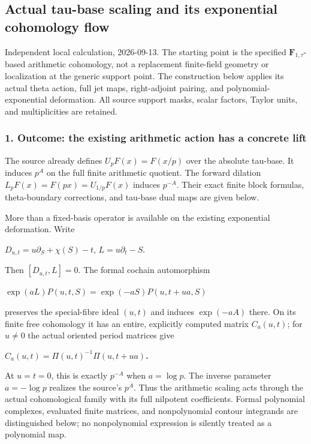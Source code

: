 \subsection{Actual tau-base scaling and its exponential cohomology flow}\label{endpoint-f1_scaling--actual-tau-base-scaling-and-its-exponential-cohomology-flow}

Independent local calculation, 2026-09-13. The starting point is the specified \(\mathbf F_{1,\tau}\)-based arithmetic cohomology, not a replacement finite-field geometry or localization at the generic support point. The construction below applies its actual theta action, full jet maps, right-adjoint pairing, and polynomial-exponential deformation. All source support masks, scalar factors, Taylor units, and multiplicities are retained.

\subsubsection{1. Outcome: the existing arithmetic action has a concrete lift}\label{endpoint-f1_scaling--outcome-the-existing-arithmetic-action-has-a-concrete-lift}

The source already defines \(U_p F(x)=F(x/p)\) over the absolute tau-base. It induces \(p^A\) on the full finite arithmetic quotient. The forward dilation \(L_p F(x)=F(px)=U_{1/p}F(x)\) induces \(p^{-A}\). Their exact finite block formulas, theta-boundary corrections, and tau-base dual maps are given below.

More than a fixed-basis operator is available on the existing exponential deformation. Write

\(D_{u,t}=u \partial_S+\chi(S)-t\), \(L=u \partial_t-S\).

Then \([D_{u,t},L]=0\). The formal cochain automorphism

\textbf{\(\exp(a L)P(u,t,S)=\exp(-aS) P(u,t+ua,S)\)}

preserves the special-fibre ideal \((u,t)\) and induces \(\exp(-aA)\) there. On its finite free cohomology it has an entire, explicitly computed matrix \(C_a(u,t)\); for \(u\ne 0\) the actual oriented period matrices give

\textbf{\(C_a(u,t)=\Pi(u,t)^{-1}\Pi(u,t+ua)\).}

At \(u=t=0\), this is exactly \(p^{-A}\) when \(a=\log p\). The inverse parameter \(a=-\log p\) realizes the source's \(p^A\). Thus the arithmetic scaling acts through the actual cohomological family with its full nilpotent coefficients. Formal polynomial complexes, evaluated finite matrices, and nonpolynomial contour integrands are distinguished below; no nonpolynomial expression is silently treated as a polynomial map.

